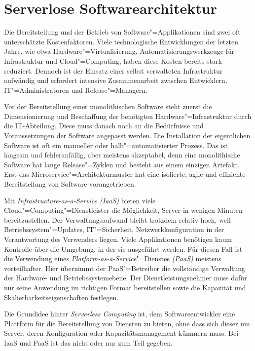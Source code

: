 \chapter{Serverlose Softwarearchitektur}

Die Bereitstellung und der Betrieb von Software"=Applikationen sind zwei oft unterschätzte Kostenfaktoren. Viele technologische Entwicklungen der letzten Jahre, wie etwa Hardware"=Virtualisierung, Automatisierungswerkzeuge für Infrastruktur und Cloud"=Computing, haben diese Kosten bereits stark reduziert. Dennoch ist der Einsatz einer selbst verwalteten Infrastruktur aufwändig und erfordert intensive Zusammenarbeit zwischen Entwicklern, IT"=Administratoren und Release"=Managern.

Vor der Bereitstellung einer monolithischen Software steht zuerst die Dimensionierung und Beschaffung der benötigten Hardware"=Infrastruktur durch die IT-Abteilung. Diese muss danach noch an die Bedürfnisse und Voraussetzungen der Software angepasst werden. Die Installation der eigentlichen Software ist oft ein manueller oder halb"=automatisierter Prozess. Das ist langsam und fehleranfällig, aber meistens akzeptabel, denn eine monolithische Software hat lange Release"=Zyklen und besteht aus einem einzigen Artefakt. Erst das Microservice"=Architekturmuster hat eine isolierte, agile und effiziente Bereitstellung von Software vorangetrieben.

Mit \textit{Infrastructure-as-a-Service (IaaS)} bieten viele Cloud"=Computing"=Dienstleister die Möglichkeit, Server in wenigen Minuten bereitzustellen. Der Verwaltungsaufwand bleibt trotzdem relativ hoch, weil Betriebssystem"=Updates, IT"=Sicherheit, Netzwerkkonfiguration \usw in der Verantwortung des Verwenders liegen. Viele Applikationen benötigen kaum Kontrolle über die Umgebung, in der sie ausgeführt werden. Für diesen Fall ist die Verwendung eines \textit{Platform-as-a-Service}"=Dienstes \textit{(PaaS)} meistens vorteilhafter. Hier übernimmt der PaaS"=Betreiber die vollständige Verwaltung der Hardware- und Betriebssystemebene. Der Dienstleistungsnehmer muss dafür nur seine Anwendung im richtigen Format bereitstellen sowie die Kapazität und Skalierbarkeitseigenschaften festlegen.

Die Grundidee hinter \textit{Serverless Computing} ist, dem Softwareentwickler eine Plattform für die Bereitstellung von Diensten zu bieten, ohne dass sich dieser um Server, deren Konfiguration oder Kapazitätsmanagement kümmern muss. Bei IaaS und PaaS ist das nicht oder nur zum Teil gegeben.

